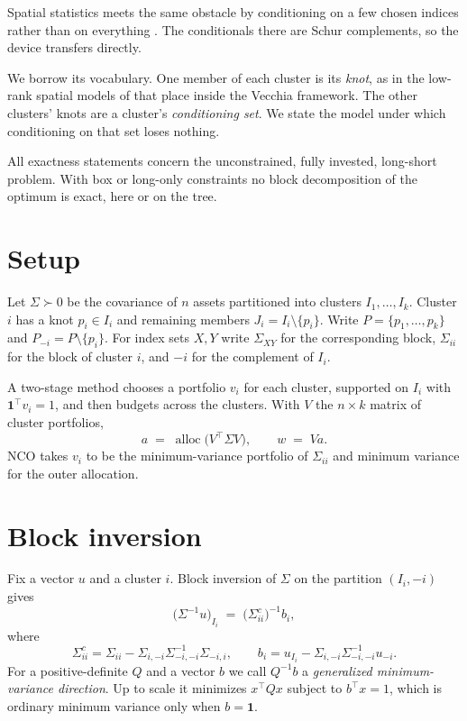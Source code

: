 \documentclass[11pt]{article}
\newcommand{\ones}{\mathbf{1}}
\begin{document}
Spatial statistics meets the same obstacle by conditioning on a few chosen
indices rather than on everything \parencite{vecchia1988}. The conditionals
there are Schur complements, so the device transfers directly.

We borrow its vocabulary. One member of each cluster is its \emph{knot}, as
in the low-rank spatial models of \textcite{banerjee2008} that
\textcite{katzfuss2021} place inside the Vecchia framework. The other
clusters' knots are a cluster's \emph{conditioning set}. We state the model
under which conditioning on that set loses nothing.

All exactness statements concern the unconstrained, fully invested,
long-short problem. With box or long-only constraints no block
decomposition of the optimum is exact, here or on the tree.

\section{Setup}

Let $\Sigma\succ0$ be the covariance of $n$ assets partitioned into
clusters $I_1,\dots,I_k$. Cluster $i$ has a knot $p_i\in I_i$ and
remaining members $J_i=I_i\setminus\{p_i\}$. Write $P=\{p_1,\dots,p_k\}$
and $P_{-i}=P\setminus\{p_i\}$. For index sets $X,Y$ write $\Sigma_{XY}$ for the
corresponding block, $\Sigma_{ii}$ for the block of cluster $i$, and $-i$
for the complement of $I_i$.

A two-stage method chooses a portfolio $v_i$ for each cluster, supported on
$I_i$ with $\ones^\top v_i=1$, and then budgets across the clusters. With
$V$ the $n\times k$ matrix of cluster portfolios,
\begin{equation}
  a \;=\; \operatorname{alloc}\!\big(V^\top\Sigma V\big),
  \qquad w \;=\; Va .
  \label{eq:twostage}
\end{equation}
NCO takes $v_i$ to be the minimum-variance portfolio of $\Sigma_{ii}$ and
minimum variance for the outer allocation.

\section{Block inversion}

Fix a vector $u$ and a cluster $i$. Block inversion of $\Sigma$ on the
partition $(I_i,-i)$ gives \parencite[App.~A]{cotton2024schur}
\begin{equation}
  \big(\Sigma^{-1}u\big)_{I_i}
  \;=\; \big(\Sigma^{c}_{ii}\big)^{-1} b_i,
  \label{eq:blockinv}
\end{equation}
where
\begin{equation}
  \Sigma^{c}_{ii} = \Sigma_{ii}-\Sigma_{i,-i}\Sigma_{-i,-i}^{-1}\Sigma_{-i,i},
  \qquad
  b_i = u_{I_i}-\Sigma_{i,-i}\Sigma_{-i,-i}^{-1}u_{-i} .
  \label{eq:complement}
\end{equation}
For a positive-definite $Q$ and a vector $b$ we call $Q^{-1}b$ a
\emph{generalized minimum-variance direction}. Up to scale it minimizes
$x^\top Qx$ subject to $b^\top x=1$, which is ordinary minimum variance only
when $b=\ones$.
\end{document}
